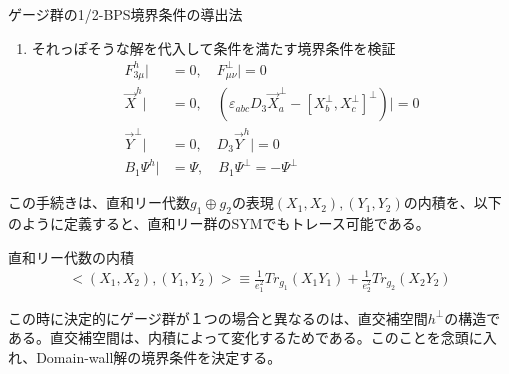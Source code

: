 \documentclass[dvipdfmx,a4paper,10.5pt]{article}
\numberwithin{equation}{section}
\begin{document}
\begin{setupbox}{ゲージ群の1/2-BPS境界条件の導出法}
\begin{enumerate}
\begin{align*}
\begin{cases}
    \bar{\epsilon}_{0}([Y_{m},Y_{n}]^{h}-\epsilon_{mnl}D_{3}Y^{h}_{l}B_{2})\theta_{0}^{h}=0\\
    \bar{\epsilon}_{0}([Y_{m},Y_{n}]^{\perp}-\epsilon_{mnl}D_{3}Y^{\perp}_{l}B_{2})\theta_{0}^{\perp}=0
        \end{cases}
    \end{align*}
    (ここまで一般的な手続き)
    \item それっぽそうな解を代入して条件を満たす境界条件を検証
    \begin{equation}
\begin{split}
     F_{3\mu}^{h}|&=0,\quad
    F_{\mu\nu}^{\perp}|=0\\
    \vec{X}^{h}|&=0,\quad
    (\varepsilon_{abc}D_{3}\vec{X}_{a}^{\perp}-[X_{b}^{\perp},X_{c}^{\perp}]^{\perp})|=0\\
    \vec{Y}^{\perp}|&=0,\quad
    D_{3}\vec{Y}^{h}|=0\\
    B_{1}\Psi^{h}|&=\Psi,\quad B_{1}\Psi^{\perp}=-\Psi^{\perp}
\end{split}
\end{equation}
\end{enumerate}
\end{setupbox}
この手続きは、直和リー代数$g_{1}\oplus g_{2}$の表現$(X_{1},X_{2}),(Y_{1},Y_{2})$の内積を、以下のように定義すると、直和リー群のSYMでもトレース可能である。
\begin{defbox}{直和リー代数の内積}
    \begin{align*}
    <(X_{1},X_{2}),(Y_{1},Y_{2})>\equiv \frac{1}{e_{1}^{2}}Tr_{g_{1}}(X_{1}Y_{1})+\frac{1}{e_{2}^{2}}Tr_{g_{2}}(X_{2}Y_{2})
\end{align*}
\end{defbox}
この時に決定的にゲージ群が１つの場合と異なるのは、直交補空間$h^{\perp}$の構造である。直交補空間は、内積によって変化するためである。このことを念頭に入れ、Domain-wall解の境界条件を決定する。
\end{document}
